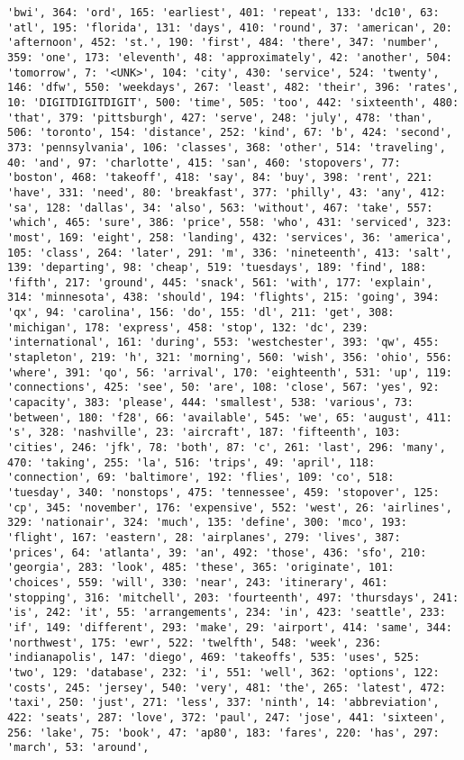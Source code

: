 \documentclass[11pt]{article}
\begin{document}
\begin{Verbatim}[commandchars=\\\{\}]
'bwi', 364: 'ord', 165: 'earliest', 401: 'repeat', 133: 'dc10', 63: 'atl', 195: 'florida', 131: 'days', 410: 'round', 37: 'american', 20: 'afternoon', 452: 'st.', 190: 'first', 484: 'there', 347: 'number', 359: 'one', 173: 'eleventh', 48: 'approximately', 42: 'another', 504: 'tomorrow', 7: '<UNK>', 104: 'city', 430: 'service', 524: 'twenty', 146: 'dfw', 550: 'weekdays', 267: 'least', 482: 'their', 396: 'rates', 10: 'DIGITDIGITDIGIT', 500: 'time', 505: 'too', 442: 'sixteenth', 480: 'that', 379: 'pittsburgh', 427: 'serve', 248: 'july', 478: 'than', 506: 'toronto', 154: 'distance', 252: 'kind', 67: 'b', 424: 'second', 373: 'pennsylvania', 106: 'classes', 368: 'other', 514: 'traveling', 40: 'and', 97: 'charlotte', 415: 'san', 460: 'stopovers', 77: 'boston', 468: 'takeoff', 418: 'say', 84: 'buy', 398: 'rent', 221: 'have', 331: 'need', 80: 'breakfast', 377: 'philly', 43: 'any', 412: 'sa', 128: 'dallas', 34: 'also', 563: 'without', 467: 'take', 557: 'which', 465: 'sure', 386: 'price', 558: 'who', 431: 'serviced', 323: 'most', 169: 'eight', 258: 'landing', 432: 'services', 36: 'america', 105: 'class', 264: 'later', 291: 'm', 336: 'nineteenth', 413: 'salt', 139: 'departing', 98: 'cheap', 519: 'tuesdays', 189: 'find', 188: 'fifth', 217: 'ground', 445: 'snack', 561: 'with', 177: 'explain', 314: 'minnesota', 438: 'should', 194: 'flights', 215: 'going', 394: 'qx', 94: 'carolina', 156: 'do', 155: 'dl', 211: 'get', 308: 'michigan', 178: 'express', 458: 'stop', 132: 'dc', 239: 'international', 161: 'during', 553: 'westchester', 393: 'qw', 455: 'stapleton', 219: 'h', 321: 'morning', 560: 'wish', 356: 'ohio', 556: 'where', 391: 'qo', 56: 'arrival', 170: 'eighteenth', 531: 'up', 119: 'connections', 425: 'see', 50: 'are', 108: 'close', 567: 'yes', 92: 'capacity', 383: 'please', 444: 'smallest', 538: 'various', 73: 'between', 180: 'f28', 66: 'available', 545: 'we', 65: 'august', 411: 's', 328: 'nashville', 23: 'aircraft', 187: 'fifteenth', 103: 'cities', 246: 'jfk', 78: 'both', 87: 'c', 261: 'last', 296: 'many', 470: 'taking', 255: 'la', 516: 'trips', 49: 'april', 118: 'connection', 69: 'baltimore', 192: 'flies', 109: 'co', 518: 'tuesday', 340: 'nonstops', 475: 'tennessee', 459: 'stopover', 125: 'cp', 345: 'november', 176: 'expensive', 552: 'west', 26: 'airlines', 329: 'nationair', 324: 'much', 135: 'define', 300: 'mco', 193: 'flight', 167: 'eastern', 28: 'airplanes', 279: 'lives', 387: 'prices', 64: 'atlanta', 39: 'an', 492: 'those', 436: 'sfo', 210: 'georgia', 283: 'look', 485: 'these', 365: 'originate', 101: 'choices', 559: 'will', 330: 'near', 243: 'itinerary', 461: 'stopping', 316: 'mitchell', 203: 'fourteenth', 497: 'thursdays', 241: 'is', 242: 'it', 55: 'arrangements', 234: 'in', 423: 'seattle', 233: 'if', 149: 'different', 293: 'make', 29: 'airport', 414: 'same', 344: 'northwest', 175: 'ewr', 522: 'twelfth', 548: 'week', 236: 'indianapolis', 147: 'diego', 469: 'takeoffs', 535: 'uses', 525: 'two', 129: 'database', 232: 'i', 551: 'well', 362: 'options', 122: 'costs', 245: 'jersey', 540: 'very', 481: 'the', 265: 'latest', 472: 'taxi', 250: 'just', 271: 'less', 337: 'ninth', 14: 'abbreviation', 422: 'seats', 287: 'love', 372: 'paul', 247: 'jose', 441: 'sixteen', 256: 'lake', 75: 'book', 47: 'ap80', 183: 'fares', 220: 'has', 297: 'march', 53: 'around', 
\end{Verbatim}
\end{document}
